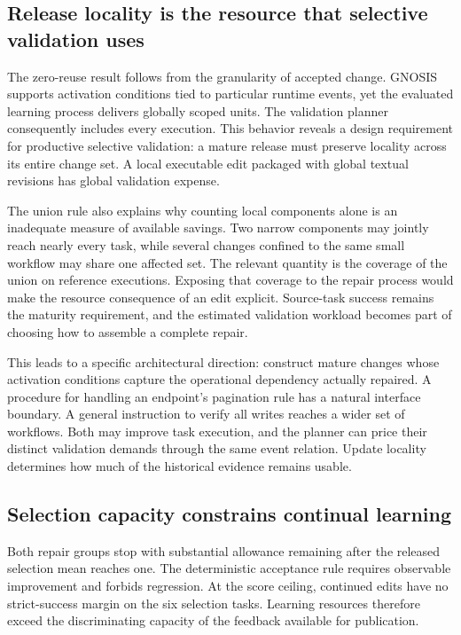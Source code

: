 \documentclass{ecai}
\begin{document}
\subsection{Release locality is the resource that selective validation uses}

The zero-reuse result follows from the granularity of accepted change. GNOSIS supports activation conditions tied to particular runtime events, yet the evaluated learning process delivers globally scoped units. The validation planner consequently includes every execution. This behavior reveals a design requirement for productive selective validation: a mature release must preserve locality across its entire change set. A local executable edit packaged with global textual revisions has global validation expense.

The union rule also explains why counting local components alone is an inadequate measure of available savings. Two narrow components may jointly reach nearly every task, while several changes confined to the same small workflow may share one affected set. The relevant quantity is the coverage of the union on reference executions. Exposing that coverage to the repair process would make the resource consequence of an edit explicit. Source-task success remains the maturity requirement, and the estimated validation workload becomes part of choosing how to assemble a complete repair.

This leads to a specific architectural direction: construct mature changes whose activation conditions capture the operational dependency actually repaired. A procedure for handling an endpoint's pagination rule has a natural interface boundary. A general instruction to verify all writes reaches a wider set of workflows. Both may improve task execution, and the planner can price their distinct validation demands through the same event relation. Update locality determines how much of the historical evidence remains usable.

\subsection{Selection capacity constrains continual learning}

Both repair groups stop with substantial allowance remaining after the released selection mean reaches one. The deterministic acceptance rule requires observable improvement and forbids regression. At the score ceiling, continued edits have no strict-success margin on the six selection tasks. Learning resources therefore exceed the discriminating capacity of the feedback available for publication.
\end{document}
